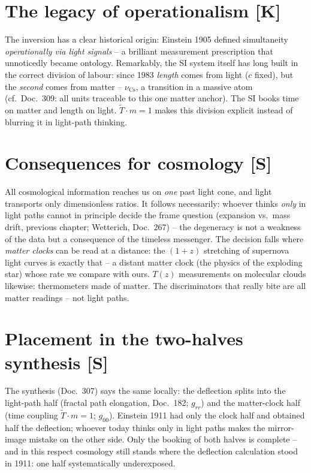 \documentclass[11pt]{report}
\begin{document}
\section{The legacy of operationalism [K]}

The inversion has a clear historical origin: Einstein 1905 defined
simultaneity \emph{operationally via light signals} -- a brilliant
measurement prescription that unnoticedly became ontology.
Remarkably, the SI system itself has long built in the correct
division of labour: since 1983 \emph{length} comes from light
($c$ fixed), but the \emph{second} comes from matter --
$\nu_\text{Cs}$, a transition in a massive atom (cf.\ Doc.~309:
all units traceable to this one matter anchor). The SI books time
on matter and length on light. $\tilde T \cdot m = 1$ makes this
division explicit instead of blurring it in light-path thinking.

\section{Consequences for cosmology [S]}

All cosmological information reaches us on \emph{one} past light
cone, and light transports only dimensionless ratios. It follows
necessarily: whoever thinks \emph{only} in light paths cannot in
principle decide the frame question (expansion vs.\ mass drift,
previous chapter; Wetterich, Doc.~267) -- the degeneracy is not a
weakness of the data but a consequence of the timeless messenger.
The decision falls where \emph{matter clocks} can be read at a
distance: the $(1+z)$ stretching of supernova light curves is
exactly that -- a distant matter clock (the physics of the
exploding star) whose rate we compare with ours. $T(z)$
measurements on molecular clouds likewise: thermometers made of
matter. The discriminators that really bite are all matter
readings -- not light paths.

\section{Placement in the two-halves synthesis [S]}

The synthesis (Doc.~307) says the same locally: the deflection
splits into the light-path half (fractal path elongation,
Doc.~182; $g_{rr}$) and the matter-clock half (time coupling
$\tilde T \cdot m = 1$; $g_{00}$). Einstein 1911 had only the
clock half and obtained half the deflection; whoever today thinks
only in light paths makes the mirror-image mistake on the other
side. Only the booking of both halves is complete -- and in this
respect cosmology still stands where the deflection calculation
stood in 1911: one half systematically underexposed.
\end{document}
